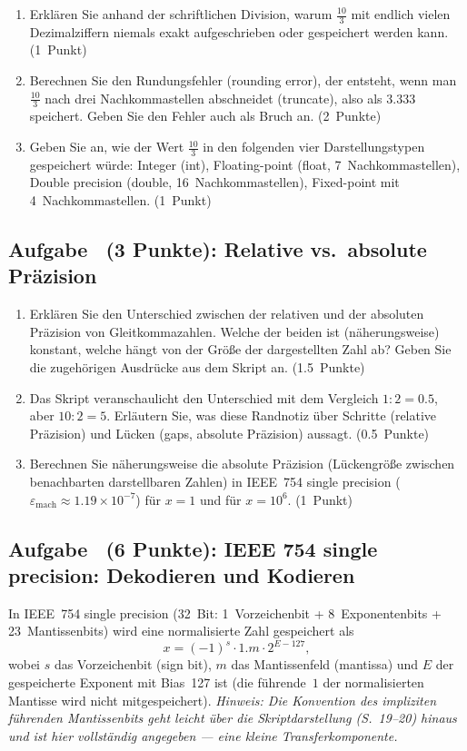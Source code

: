 \documentclass[a4paper,11pt]{scrartcl}
\newcounter{aufgabe}
\newcommand{\aufgabe}[2]{%
  \refstepcounter{aufgabe}%
  \subsection*{Aufgabe \theaufgabe\ (#2): #1}%
}
\begin{document}
\begin{enumerate}[label=(\alph*)]
  \item Erklären Sie anhand der schriftlichen Division, warum $\frac{10}{3}$ mit endlich vielen Dezimalziffern niemals exakt aufgeschrieben oder gespeichert werden kann. \hfill (1~Punkt)
  \item Berechnen Sie den Rundungsfehler (rounding error), der entsteht, wenn man $\frac{10}{3}$ nach drei Nachkommastellen abschneidet (truncate), also als $3.333$ speichert. Geben Sie den Fehler auch als Bruch an. \hfill (2~Punkte)
  \item Geben Sie an, wie der Wert $\frac{10}{3}$ in den folgenden vier Darstellungstypen gespeichert würde: Integer (int), Floating-point (float, 7~Nachkommastellen), Double precision (double, 16~Nachkommastellen), Fixed-point mit 4~Nachkommastellen. \hfill (1~Punkt)
\end{enumerate}

\schreibraum[7]
\aufgabe{Relative vs.\ absolute Präzision}{3 Punkte}\label{auf:3}

\begin{enumerate}[label=(\alph*)]
  \item Erklären Sie den Unterschied zwischen der relativen und der absoluten Präzision von Gleitkommazahlen. Welche der beiden ist (näherungsweise) konstant, welche hängt von der Größe der dargestellten Zahl ab? Geben Sie die zugehörigen Ausdrücke aus dem Skript an. \hfill (1.5~Punkte)
  \item Das Skript veranschaulicht den Unterschied mit dem Vergleich $1:2 = 0.5$, aber $10:2 = 5$. Erläutern Sie, was diese Randnotiz über Schritte (relative Präzision) und Lücken (gaps, absolute Präzision) aussagt. \hfill (0.5~Punkte)
  \item Berechnen Sie näherungsweise die absolute Präzision (Lückengröße zwischen benachbarten darstellbaren Zahlen) in IEEE~754 single precision ($\varepsilon_{\text{mach}} \approx 1.19 \times 10^{-7}$) für $x = 1$ und für $x = 10^6$. \hfill (1~Punkt)
\end{enumerate}

\schreibraum[6]
\aufgabe{IEEE 754 single precision: Dekodieren und Kodieren}{6 Punkte}\label{auf:4}

In IEEE~754 single precision (32~Bit: 1~Vorzeichenbit + 8~Exponentenbits + 23~Mantissenbits) wird eine normalisierte Zahl gespeichert als
\[
x = (-1)^s \cdot 1.m \cdot 2^{E - 127},
\]
wobei $s$ das Vorzeichenbit (sign bit), $m$ das Mantissenfeld (mantissa) und $E$ der gespeicherte Exponent mit Bias~127 ist (die führende~$1$ der normalisierten Mantisse wird nicht mitgespeichert). \emph{Hinweis: Die Konvention des impliziten führenden Mantissenbits geht leicht über die Skriptdarstellung (S.~19--20) hinaus und ist hier vollständig angegeben --- eine kleine Transferkomponente.}
\end{document}
